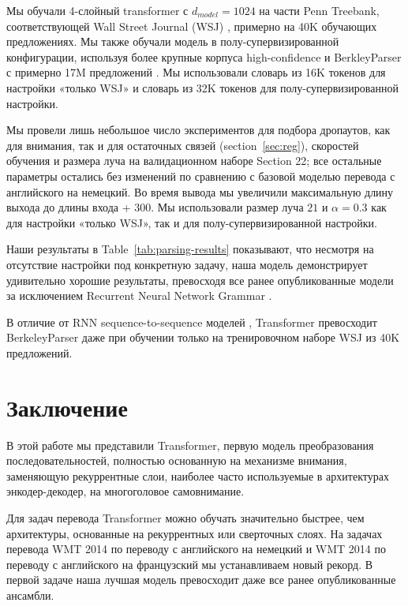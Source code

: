 \documentclass{article}
\begin{document}
Мы обучали 4-слойный transformer с $d_{model} = 1024$ на части Penn Treebank, соответствующей Wall Street Journal (WSJ) \citep{marcus1993building}, примерно на 40K обучающих предложениях. Мы также обучали модель в полу-супервизированной конфигурации, используя более крупные корпуса high-confidence и BerkleyParser с примерно 17M предложений \citep{KVparse15}. Мы использовали словарь из 16K токенов для настройки «только WSJ» и словарь из 32K токенов для полу-супервизированной настройки.

Мы провели лишь небольшое число экспериментов для подбора дропаутов, как для внимания, так и для остаточных связей (section~\ref{sec:reg}), скоростей обучения и размера луча на валидационном наборе Section 22; все остальные параметры остались без изменений по сравнению с базовой моделью перевода с английского на немецкий. Во время вывода мы увеличили максимальную длину выхода до длины входа + $300$. Мы использовали размер луча $21$ и $\alpha=0.3$ как для настройки «только WSJ», так и для полу-супервизированной настройки.

Наши результаты в Table~\ref{tab:parsing-results} показывают, что несмотря на отсутствие настройки под конкретную задачу, наша модель демонстрирует удивительно хорошие результаты, превосходя все ранее опубликованные модели за исключением Recurrent Neural Network Grammar \cite{dyer-rnng:16}.

В отличие от RNN sequence-to-sequence моделей \citep{KVparse15}, Transformer превосходит BerkeleyParser \cite{petrov-EtAl:2006:ACL} даже при обучении только на тренировочном наборе WSJ из 40K предложений.

\section{Заключение}
В этой работе мы представили Transformer, первую модель преобразования последовательностей, полностью основанную на механизме внимания, заменяющую рекуррентные слои, наиболее часто используемые в архитектурах энкодер-декодер, на многоголовое самовнимание.

Для задач перевода Transformer можно обучать значительно быстрее, чем архитектуры, основанные на рекуррентных или сверточных слоях. На задачах перевода WMT 2014 по переводу с английского на немецкий и WMT 2014 по переводу с английского на французский мы устанавливаем новый рекорд. В первой задаче наша лучшая модель превосходит даже все ранее опубликованные ансамбли. %
\end{document}
